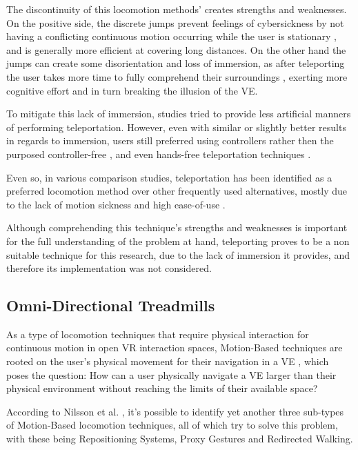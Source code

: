 The discontinuity of this locomotion methods' creates strengths and weaknesses. On the positive side, the discrete jumps prevent feelings of
cybersickness by not having a conflicting continuous motion occurring while the user is stationary \cite{Boletsis2019, Nasiri2023}, 
and is generally more efficient at covering long distances\cite{Coomer2018}. On the other hand the jumps can create some disorientation and
loss of immersion, as after teleporting the user takes more time to fully comprehend their surroundings \cite{Langbehn2018}, exerting more
cognitive effort and in turn breaking the illusion of the \gls{VE}.

To mitigate this lack of immersion, studies tried to provide less artificial manners of performing teleportation. However, even with similar or 
slightly better results in regards to immersion, users still preferred using controllers rather then the purposed controller-free \cite{Bozgeyikli2016}, 
and even hands-free teleportation techniques \cite{Prithul2022}.

Even so, in various comparison studies, teleportation has been identified as a preferred locomotion method over other frequently used 
alternatives, mostly due to the lack of motion sickness and high ease-of-use \cite{Boletsis2019, Langbehn2018}.

Although comprehending this technique's strengths and weaknesses is important for the full understanding of the problem at hand, teleporting proves 
to be a non suitable technique for this research, due to the lack of immersion it provides, and therefore its implementation was not considered.

\subsection{Omni-Directional Treadmills}
\label{sec:omni-directional-treadmills}

As a type of locomotion techniques that require physical interaction for continuous motion in open \gls{VR} interaction spaces, 
Motion-Based techniques are rooted on the user's physical movement for their navigation in a \gls{VE} \cite{Boletsis2017}, which poses the
question: How can a user physically navigate a \gls{VE} larger than their physical environment without reaching the limits 
of their available space?

According to Nilsson et al. \cite{Nilsson2018}, it's possible to identify yet another three sub-types of Motion-Based 
locomotion techniques, all of which try to solve this problem, with these being Repositioning Systems, Proxy Gestures and 
Redirected Walking.

